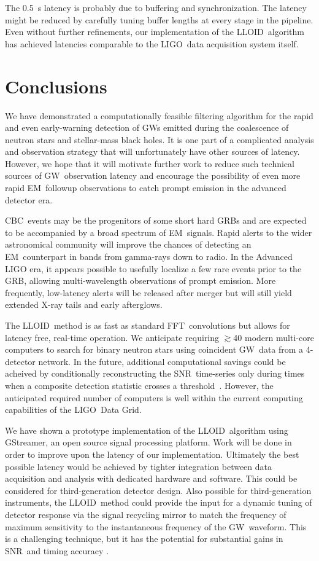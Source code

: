 \documentclass[preprint2]{aastex}
\newcommand{\GW}{GW}%
\newcommand{\EM}{EM}%
\newcommand{\GRB}{GRB}%
\newcommand{\CBC}{CBC}%
\newcommand{\LIGO}{LIGO}%
\newcommand{\SNR}{SNR}%
\newcommand{\fft}{FFT}%
\newcommand{\gstreamer}{GStreamer}
\newcommand{\lloid}{LLOID}%
\begin{document}
The 0.5~s latency is probably due to buffering and synchronization.  The latency
might be reduced by carefully tuning buffer lengths at every stage in the
pipeline.  Even without further refinements, our implementation of the \lloid\
algorithm has achieved latencies comparable to the \LIGO\ data acquisition
system itself.  

\section{Conclusions}

We have demonstrated a computationally feasible filtering algorithm for the rapid
and even early-warning detection of \GW{}s emitted during the coalescence
of neutron stars and stellar-mass black holes.  It is one part of a complicated
analysis and observation strategy that will unfortunately have other sources of
latency.  However, we hope that it will motivate further work to reduce such
technical sources of \GW\ observation latency and encourage the possibility of
even more rapid \EM\ followup observations to catch prompt emission in the
advanced detector era.

\CBC\ events may be the progenitors of some short hard \GRB{}s and are expected
to be accompanied by a broad spectrum of \EM\ signals. Rapid alerts to the
wider astronomical community will improve the chances of detecting an \EM\
counterpart in bands from gamma-rays down to radio. In the Advanced LIGO
era, it appears possible to usefully localize a few rare events prior to the
\GRB{}, allowing multi-wavelength observations of prompt emission. More
frequently, low-latency alerts will be released after merger but will still
yield extended X-ray tails and early afterglows.

The \lloid\ method is as fast as standard \fft\ convolutions but allows for
latency free, real-time operation.  We anticipate requiring $\gtrsim$40
modern multi-core computers to search for binary neutron stars using
coincident \GW\ data from a 4-detector network.  In the future, additional
computational savings could be acheived by conditionally reconstructing the
\SNR\ time-series only during times when a composite detection statistic
crosses a threshold~\citep{svd-compdetstat}.  However, the anticipated required
number of computers is well within the current computing capabilities of the
\LIGO\ Data Grid.

We have shown a prototype implementation of the \lloid\ algorithm using
\gstreamer, an open source signal processing platform.  Work will be done in
order to improve upon the latency of our implementation.  Ultimately the best
possible latency would be achieved by tighter integration between data
acquisition and analysis with dedicated hardware and software. This could be
considered for third-generation detector design.  Also possible for
third-generation instruments, the \lloid\ method could provide the input for a
dynamic tuning of detector response via the signal recycling mirror to match
the frequency of maximum sensitivity to the instantaneous frequency of the
\GW\ waveform.  This is a challenging technique, but it has the potential for
substantial gains in \SNR\ and timing accuracy \citep{PhysRevD.47.2184}.
\end{document}
